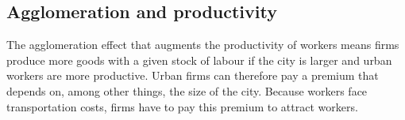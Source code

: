 
\subsection{Agglomeration and productivity}\label{sec:Production-fn}

The agglomeration effect that augments the productivity of workers means firms produce more goods with a given stock of labour if the city is larger and urban workers are more productive. %
Urban firms can therefore pay a premium that depends on, among other things,  the size of the city. Because workers face transportation costs, firms have to pay this premium to attract workers. %


